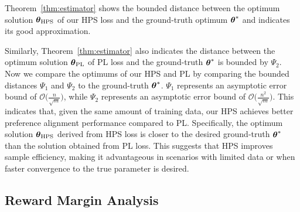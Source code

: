 \vspace{-9.5pt}
Theorem~\ref{thm:estimator} shows the bounded distance between the optimum solution $\boldsymbol{\theta}_{\text{HPS}}$ of our HPS loss and the ground-truth optimum $\boldsymbol{\theta}^{*}$ and indicates its  good approximation.

\vspace{-0.5pt}

Similarly, Theorem~\ref{thm:estimator} also indicates  the distance between the optimum solution $\boldsymbol{\theta}_{\text{PL}}$ of PL  loss and the ground-truth  $\boldsymbol{\theta}^{*}$ is  bounded by $\Psi_{2}$. Now we compare the optimums of our HPS and PL by comparing the bounded distances $\Psi_{1}$ and $\Psi_{2}$ to  the ground-truth  $\boldsymbol{\theta}^{*}$. $\Psi_{1}$ represents an asymptotic error bound of $\mathcal{O}\big(\frac{n}{\sqrt{m}}\big)$, while $\Psi_{2}$ represents an asymptotic error bound of $\mathcal{O}\big(\frac{n^{2}}{\sqrt{m}}\big)$. This indicates that, given the same amount of training data, our HPS   achieves better preference alignment performance compared to PL. Specifically, the optimum solution $\boldsymbol{\theta}_{\text{HPS}}$ derived from HPS loss is closer to the desired ground-truth $\boldsymbol{\theta}^{*}$ than the solution obtained from PL loss.  This   suggests that  HPS      improves sample efficiency, making it advantageous in scenarios with limited data or when faster convergence to the true parameter is desired.  
\vspace{-4.5pt}
\subsection{Reward Margin Analysis}
\vspace{-0.5pt}
\label{sec:proverm}



